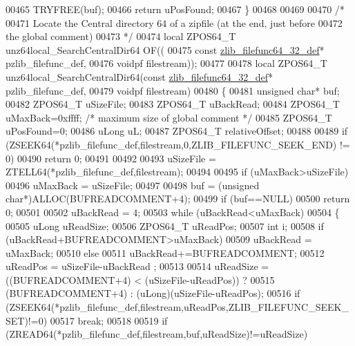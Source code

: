 \begin{DoxyCode}
00465     TRYFREE(buf);
00466     \textcolor{keywordflow}{return} uPosFound;
00467 \}
00468 
00469 
00470 \textcolor{comment}{/*}
00471 \textcolor{comment}{  Locate the Central directory 64 of a zipfile (at the end, just before}
00472 \textcolor{comment}{    the global comment)}
00473 \textcolor{comment}{*/}
00474 local ZPOS64\_T unz64local\_SearchCentralDir64 OF((
00475     \textcolor{keyword}{const} \hyperlink{structzlib__filefunc64__32__def__s}{zlib\_filefunc64\_32\_def}* pzlib\_filefunc\_def,
00476     voidpf filestream));
00477 
00478 local ZPOS64\_T unz64local\_SearchCentralDir64(\textcolor{keyword}{const} \hyperlink{structzlib__filefunc64__32__def__s}{zlib\_filefunc64\_32\_def}* 
      pzlib\_filefunc\_def,
00479                                       voidpf filestream)
00480 \{
00481     \textcolor{keywordtype}{unsigned} \textcolor{keywordtype}{char}* buf;
00482     ZPOS64\_T uSizeFile;
00483     ZPOS64\_T uBackRead;
00484     ZPOS64\_T uMaxBack=0xffff; \textcolor{comment}{/* maximum size of global comment */}
00485     ZPOS64\_T uPosFound=0;
00486     uLong uL;
00487                 ZPOS64\_T relativeOffset;
00488 
00489     \textcolor{keywordflow}{if} (ZSEEK64(*pzlib\_filefunc\_def,filestream,0,ZLIB\_FILEFUNC\_SEEK\_END) != 0)
00490         \textcolor{keywordflow}{return} 0;
00491 
00492 
00493     uSizeFile = ZTELL64(*pzlib\_filefunc\_def,filestream);
00494 
00495     \textcolor{keywordflow}{if} (uMaxBack>uSizeFile)
00496         uMaxBack = uSizeFile;
00497 
00498     buf = (\textcolor{keywordtype}{unsigned} \textcolor{keywordtype}{char}*)ALLOC(BUFREADCOMMENT+4);
00499     \textcolor{keywordflow}{if} (buf==NULL)
00500         \textcolor{keywordflow}{return} 0;
00501 
00502     uBackRead = 4;
00503     \textcolor{keywordflow}{while} (uBackRead<uMaxBack)
00504     \{
00505         uLong uReadSize;
00506         ZPOS64\_T uReadPos;
00507         \textcolor{keywordtype}{int} i;
00508         \textcolor{keywordflow}{if} (uBackRead+BUFREADCOMMENT>uMaxBack)
00509             uBackRead = uMaxBack;
00510         \textcolor{keywordflow}{else}
00511             uBackRead+=BUFREADCOMMENT;
00512         uReadPos = uSizeFile-uBackRead ;
00513 
00514         uReadSize = ((BUFREADCOMMENT+4) < (uSizeFile-uReadPos)) ?
00515                      (BUFREADCOMMENT+4) : (uLong)(uSizeFile-uReadPos);
00516         \textcolor{keywordflow}{if} (ZSEEK64(*pzlib\_filefunc\_def,filestream,uReadPos,ZLIB\_FILEFUNC\_SEEK\_SET)!=0)
00517             \textcolor{keywordflow}{break};
00518 
00519         \textcolor{keywordflow}{if} (ZREAD64(*pzlib\_filefunc\_def,filestream,buf,uReadSize)!=uReadSize)

\end{DoxyCode}
